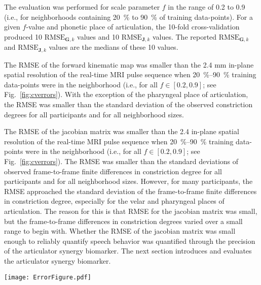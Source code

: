 \documentclass[preprint]{JASAnew}\usepackage[]{graphicx}\usepackage[]{color}
\begin{document}
The evaluation was performed for scale parameter $f$ in the range of \num{0.2} to \num{0.9} (i.e., for neighborhoods containing \SI{20}{\percent} to \SI{90}{\percent} of training data-points). 
%
For a given $f$-value and phonetic place of articulation, the 10-fold cross-validation produced \num{10} $\mathrm{RMSE}_{\mathbf{G},k}$ values and \num{10} $\mathrm{RMSE}_{\mathbf{J},k}$ values.
%
The reported $\mathrm{RMSE}_{\mathbf{G},k}$ and $\mathrm{RMSE}_{\mathbf{J},k}$ values are the medians of these \num{10} values.



The RMSE of the forward kinematic map was smaller than the 2.4 mm in-plane spatial resolution of the real-time MRI pulse sequence when \SIrange{20}{90}{\percent} training data-points were in the neighborhood (i.e., for all $f\in \left[ 0.2, 0.9\right]$; see Fig.~\ref{fig:cverrors}). With the exception of the pharyngeal place of articulation, the RMSE was smaller than the standard deviation of the observed constriction degrees for all participants and for all neighborhood sizes.


The RMSE of the jacobian matrix was smaller than the 2.4 in-plane spatial resolution of the real-time MRI pulse sequence when \SIrange{20}{90}{\percent} training data-points were in the neighborhood (i.e., for all $f\in \left[ 0.2, 0.9\right]$; see Fig.~\ref{fig:cverrors}).
%
The RMSE was smaller than the standard deviations of observed frame-to-frame finite differences in constriction degree for all participants and for all neighborhood sizes. 
%
However, for many participants, the RMSE approached the standard deviation of the frame-to-frame finite differences in constriction degree, especially for the velar and pharyngeal places of articulation.
%
The reason for this is that RMSE for the jacobian matrix was small, but the frame-to-frame differences in constriction degrees varied over a small range to begin with. 
% 
Whether the RMSE of the jacobian matrix was small enough to reliably quantify speech behavior was quantified through the precision of the articulator synergy biomarker. 
% 
The next section introduces and evaluates the articulator synergy biomarker. 

\begin{figure*}
\raggedright

\texttt{[image: ErrorFigure.pdf]}

\caption{(color online) 
{\bf (a)} Root mean squared error (RMSE) of the forward kinematic map estimator of constriction degrees and {\bf (b)} RMSE of the jacobian matrix estimator of frame-to-frame finite differences in constriction degrees. 
Data-points are the median RMSE computed over all 10 folds of cross-validation.
Lines connect the RMSE values of a single participant at different neighborhood sizes ($X$-axis).
Neighborhood size is given as percentage of training data-points.
The standard deviations of observed (frame-to-frame finite differences in) constriction degrees are indicated as tick marks on the right $Y$-axis for each participant whenever the standard deviations are small enough to fit within the $Y$-axis limits.}
\label{fig:cverrors}
\end{figure*}
\end{document}
